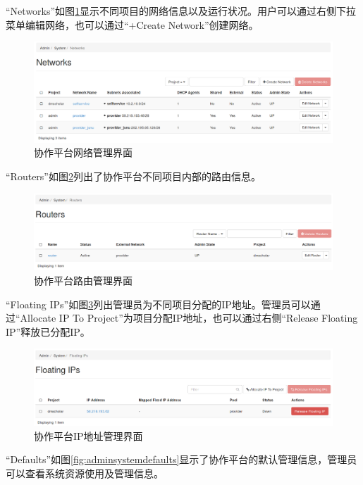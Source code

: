 \documentclass[12pt]{ctexart}%
\begin{document}
``Networks''如图\ref{fig:adminsystemnetworks}显示不同项目的网络信息以及运行状况。用户可以通过右侧下拉菜单编辑网络，也可以通过``+Create Network''创建网络。
\begin{figure}[!htb]
\centering
\includegraphics[width=6in]{./figures/Admin_System_Networks}
\caption{协作平台网络管理界面}
\label{fig:adminsystemnetworks}
\end{figure}
``Routers''如图\ref{fig:adminsystemrouters}列出了协作平台不同项目内部的路由信息。
\begin{figure}[!htb]
\centering
\includegraphics[width=6in]{./figures/Admin_System_Routers}
\caption{协作平台路由管理界面}
\label{fig:adminsystemrouters}
\end{figure}
``Floating IPs''如图\ref{fig:adminsystemfloatingip}列出管理员为不同项目分配的IP地址。管理员可以通过``Allocate IP To Project''为项目分配IP地址，也可以通过右侧``Release Floating IP''释放已分配IP。
\begin{figure}[!htb]
\centering
\includegraphics[width=6in]{./figures/Admin_System_FloatingIP}
\caption{协作平台IP地址管理界面}
\label{fig:adminsystemfloatingip}
\end{figure}
``Defaults''如图\ref{fig:adminsystemdefaults}显示了协作平台的默认管理信息，管理员可以查看系统资源使用及管理信息。
\end{document}
